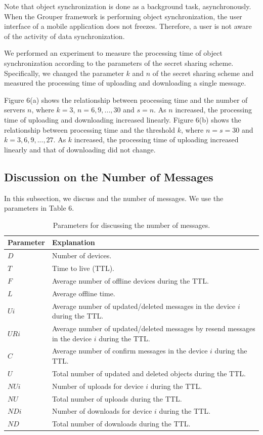 \documentclass{sig-alternate-05-2015}
\begin{document}
Note that object synchronization is done as a background task, asynchronously.
When the Grouper framework is performing object synchronization, the user interface of a mobile application does not freezes.
Therefore, a user is not aware of the activity of data synchronization.

We performed an experiment to measure the processing time of object synchronization according to the parameters of the secret sharing scheme.
Specifically, we changed the parameter ${k}$ and ${n}$ of the secret sharing scheme and measured the processing time of uploading and downloading a single message.

Figure 6(a) shows the relationship between processing time and the number of servers ${n}$, where ${k=3}$,  ${n = 6, 9, ... , 30}$ and $s = n$.
As $n$ increased, the processing time of uploading and downloading increased linearly. 
Figure 6(b) shows the relationship between processing time and the threshold ${k}$, where ${n = s =30}$ and ${k = 3, 6, 9, ... , 27}$.
As $k$ increased, the processing time of uploading increased linearly and that of downloading did not change.

\subsection{Discussion on the Number of Messages}

In this subsection, we discuss and the number of messages. 
We use the parameters in Table 6.

\begin{table}[t]
	\centering
	\caption{Parameters for discussing the number of messages.}
	\begin{tabular}{ll}
		\hline
		\textbf{Parameter} & \textbf{Explanation} \\ \hline
		$D$ & Number of devices. \\
		$T$ & Time to live (TTL). \\
		$F$ & Average number of offline devices during the TTL. \\
		$L$ & Average offline time. \\
		$Ui$ & Average number of updated/deleted messages in the device $i$ during the TTL. \\ 
		$URi$ & Average number of updated/deleted messages by resend messages in the device $i$ during the TTL.\\ 
		$C$ & Average number of confirm messages in the device $i$ during the TTL. \\ 
		$U$ & Total number of updated and deleted objects during the TTL. \\ 
		$NUi$ & Number of uploads for device $i$ during the TTL. \\
		$NU$ & Total number of uploads during the TTL. \\
		$NDi$ & Number of downloads for device $i$ during the TTL. \\
		$ND$ & Total number of downloads during the TTL. \\ \hline
	\end{tabular}
\end{table}
\end{document}
